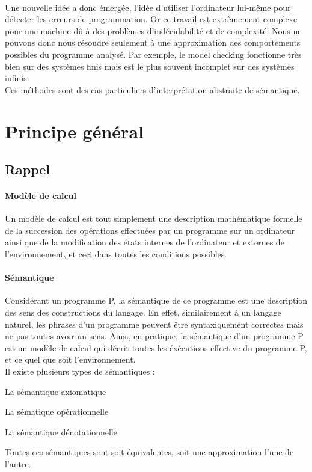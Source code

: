\documentclass[french]{report}
\begin{document}
\paragraph{}
Une nouvelle idée a donc émergée, l'idée d'utiliser l'ordinateur lui-même pour détecter
les erreurs de programmation. Or ce travail est extrèmement complexe pour une machine dû à des
problèmes d'indécidabilité et de complexité. Nous ne pouvons donc nous résoudre seulement à une approximation
des comportements possibles du programme analysé.
Par exemple, le model checking fonctionne très bien sur des systèmes finis mais est
le plus souvent incomplet sur des systèmes infinis.  \\

Ces méthodes sont des cas particuliers d'interprétation abstraite de sémantique.

\section{Principe général}

\subsection{Rappel}
\paragraph{Modèle de calcul}
Un modèle de calcul est tout simplement une description mathématique formelle
de la succession des opérations effectuées par un programme sur un ordinateur ainsi que de
la modification des états internes de l'ordinateur et externes de l'environnement, et ceci
dans toutes les conditions possibles.

\paragraph{Sémantique}
Considérant un programme P, la sémantique de ce programme est une description des sens des
constructions du langage. En effet, similairement à un langage naturel, les phrases d'un programme
peuvent être syntaxiquement correctes mais ne pas toutes avoir un sens. Ainsi, en pratique,
la sémantique d'un programme P est un modèle de calcul qui décrit toutes les
éxécutions effective du programme P, et ce quel que soit l'environnement. \\
Il existe plusieurs types de sémantiques :
\begin{description}
    \item La sémantique axiomatique
    \item La sématique opérationnelle
    \item La sémantique dénotationnelle
\end{description}
Toutes ces sémantiques sont soit équivalentes, soit une approximation l'une de l'autre.
\end{document}
